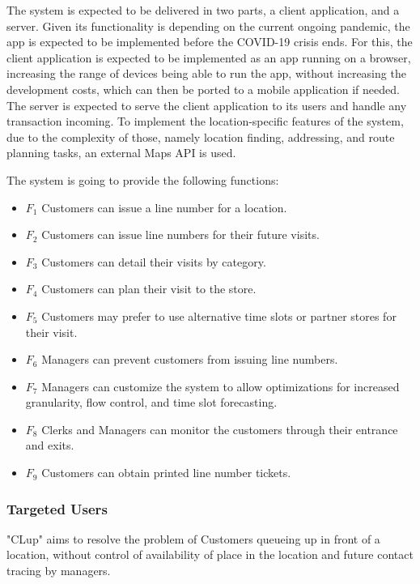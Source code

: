The system is expected to be delivered in two parts, a client application, and a server.
Given its functionality is depending on the current ongoing pandemic, the app is expected to be implemented before the COVID-19 crisis ends.
For this, the client application is expected to be implemented as an app running on a browser, increasing the range of devices being able to run the app, without increasing the development costs, which can then be ported to a mobile application if needed.
The server is expected to serve the client application to its users and handle any transaction incoming.
To implement the location-specific features of the system, due to the complexity of those, namely location finding, addressing, and route planning tasks, an external Maps API is used.

The system is going to provide the following functions:
\begin{itemize}
    \item \textbf{$F_{1}$} Customers can issue a line number for a location.
    \item \textbf{$F_{2}$} Customers can issue line numbers for their future visits.
    \item \textbf{$F_{3}$} Customers can detail their visits by category.
    \item \textbf{$F_{4}$} Customers can plan their visit to the store.
    \item \textbf{$F_{5}$} Customers may prefer to use alternative time slots or partner stores for their visit.
    \item \textbf{$F_{6}$} Managers can prevent customers from issuing line numbers.
    \item \textbf{$F_{7}$} Managers can customize the system to allow optimizations for increased granularity, flow control, and time slot forecasting.
    \item \textbf{$F_{8}$} Clerks and Managers can monitor the customers through their entrance and exits.
    \item \textbf{$F_{9}$} Customers can obtain printed line number tickets.
\end{itemize}

\subsubsection{Targeted Users}
"CLup" aims to resolve the problem of Customers queueing up in front of a location, without control of availability of place in the location and future contact tracing by managers.
\\[0.5cm]


